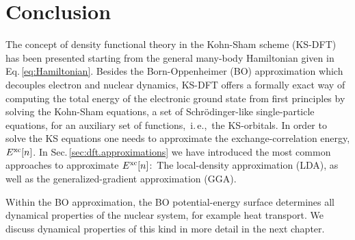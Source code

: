 \section{Conclusion}
The concept of density functional theory in the Kohn-Sham scheme (KS-DFT) has been presented starting from the general many-body Hamiltonian given in Eq.\,\eqref{eq:Hamiltonian}. Besides the Born-Oppenheimer (BO) approximation which decouples electron and nuclear dynamics, KS-DFT offers a formally exact way of computing the total energy of the electronic ground state from first principles by solving the Kohn-Sham equations, a set of Schr\"odinger-like single-particle equations, for an auxiliary set of functions,~i.\,e.,~the KS-orbitals. In order to solve the KS equations one needs to approximate the exchange-correlation energy, $E^{\rm xc} [n]$. In Sec.\,\ref{sec:dft.approximations} we have introduced the most common approaches to approximate $E^{\rm xc} [n]$:~The local-density approximation (LDA), as well as the generalized-gradient approximation (GGA).

Within the BO approximation, the BO potential-energy surface determines all dynamical properties of the nuclear system, for example heat transport. We discuss dynamical properties of this kind in more detail in the next chapter.
